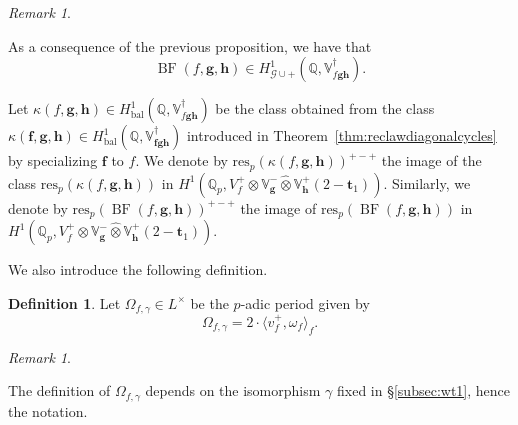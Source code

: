 \documentclass[a4paper,11pt]{amsart}
\theoremstyle{plain}
\theoremstyle{definition}
\newtheorem{defi}[theorem]{Definition}
\theoremstyle{remark}
\newtheorem{remarkwr}[theorem]{Remark}
\newenvironment{remark}{\begin{remarkwr}\begin{upshape}}{\end{upshape}\end{remarkwr}}
\newcommand{\bb}{\mathbb}
\newcommand{\cl}{\mathcal}
\DeclareMathOperator{\BF}{BF}
\DeclareMathOperator{\bal}{bal}
\newcommand{\hf}{{\mathbf{f}}}
\newcommand{\hg}{{\mathbf{g}}}
\newcommand{\hh}{{\mathbf h}}
\newcommand{\res}{\mathrm{res}}
\numberwithin{equation}{section}
\begin{document}
\begin{remark}\label{rk:localconditionforBF}
    As a consequence of the previous proposition, we have that
    \[
    \BF(f,\hg,\hh)\in H^1_{\cl{G}\cup+}(\bb{Q},\bb{V}_{f\hg\hh}^\dagger).
    \]
\end{remark}


Let $\kappa(f,\hg,\hh)\in H^1_{\bal}(\bb{Q},\bb{V}_{f\hg\hh}^\dagger)$ be the class obtained from the class $\kappa(\hf,\hg,\hh)\in H^1_{\bal}(\bb{Q},\bb{V}_{\hf\hg\hh}^\dagger)$ introduced in Theorem~\ref{thm:reclawdiagonalcycles} by specializing $\hf$ to $f$. We denote by $\res_p(\kappa(f,\hg,\hh))^{+-+}$ the image of the class $\res_p(\kappa(f,\hg,\hh))$ in $H^1(\bb{Q}_p,V_f^+\otimes\bb{V}_\hg^-\hat{\otimes}\bb{V}_\hh^+(2-\mathbf{t}_1))$. Similarly, we denote by $\res_p(\BF(f,\hg,\hh))^{+-+}$ the image of $\res_p(\BF(f,\hg,\hh))$ in $H^1(\bb{Q}_p,V_f^+\otimes\bb{V}_\hg^-\hat{\otimes}\bb{V}_\hh^+(2-\mathbf{t}_1))$.

We also introduce the following definition.

\begin{defi}\label{def:period}
Let $\Omega_{f, \gamma} \in L^{\times}$ be the $p$-adic period given by
\[
\Omega_{f,\gamma} = 2 \cdot \langle v_f^+, \omega_f \rangle_f.
\] 
\end{defi}

\begin{remark}
The definition of $\Omega_{f,\gamma}$ depends on the isomorphism $\gamma$ fixed in \S\ref{subsec:wt1}, hence the notation.    
\end{remark}

\end{document}
